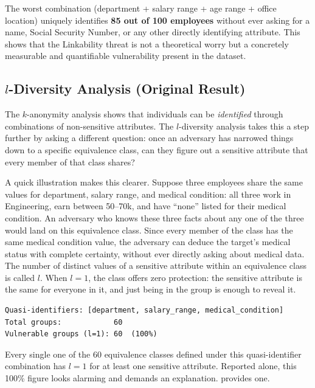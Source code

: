 \documentclass[12pt, a4paper]{report}
\begin{document}
The worst combination (department + salary range + age range + office location) uniquely identifies \textbf{85 out of 100 employees} without ever asking for a name, Social Security Number, or any other directly identifying attribute. This shows that the Linkability threat is not a theoretical worry but a concretely measurable and quantifiable vulnerability present in the dataset.

\subsection{$l$-Diversity Analysis (Original Result)}

The $k$-anonymity analysis shows that individuals can be \emph{identified} through combinations of non-sensitive attributes. The $l$-diversity analysis takes this a step further by asking a different question: once an adversary has narrowed things down to a specific equivalence class, can they figure out a sensitive attribute that every member of that class shares?

A quick illustration makes this clearer. Suppose three employees share the same values for department, salary range, and medical condition: all three work in Engineering, earn between 50--70k, and have ``none'' listed for their medical condition. An adversary who knows these three facts about any one of the three would land on this equivalence class. Since every member of the class has the same medical condition value, the adversary can deduce the target's medical status with complete certainty, without ever directly asking about medical data. The number of distinct values of a sensitive attribute within an equivalence class is called $l$. When $l = 1$, the class offers zero protection: the sensitive attribute is the same for everyone in it, and just being in the group is enough to reveal it.

\begin{resultbox}
\begin{lstlisting}[style=termstyle]
Quasi-identifiers: [department, salary_range, medical_condition]
Total groups:            60
Vulnerable groups (l=1): 60  (100%)
\end{lstlisting}
Every single one of the 60 equivalence classes defined under this quasi-identifier combination has $l = 1$ for at least one sensitive attribute. Reported alone, this 100\% figure looks alarming and demands an explanation.  provides one.
\end{resultbox}
\end{document}
